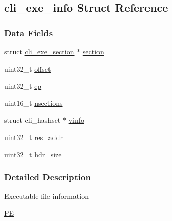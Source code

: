 \hypertarget{structcli__exe__info}{
\subsection{cli\_\-exe\_\-info Struct Reference}
\label{structcli__exe__info}
}
\subsubsection*{Data Fields}
\begin{DoxyCompactItemize}
\item 
struct \hyperlink{structcli__exe__section}{cli\_\-exe\_\-section} $\ast$ \hyperlink{structcli__exe__info_a1c449c2a02971006b72d8ab755684716}{section}
\item 
uint32\_\-t \hyperlink{structcli__exe__info_a894bdfa2d603d8343f8ef01dda6fcd23}{offset}
\item 
uint32\_\-t \hyperlink{structcli__exe__info_afaed4671662028c061ab84eefcce0546}{ep}
\item 
uint16\_\-t \hyperlink{structcli__exe__info_aa4af5e526457df524fc9a4ba46803a70}{nsections}
\item 
struct cli\_\-hashset $\ast$ \hyperlink{structcli__exe__info_a45edc7cf7855a99b33ce31a17c6bdfc6}{vinfo}
\item 
uint32\_\-t \hyperlink{structcli__exe__info_ac0f1b36bb8a1eeb981958dc4643f67dd}{res\_\-addr}
\item 
uint32\_\-t \hyperlink{structcli__exe__info_af2492dd421362ffced98eb583964b310}{hdr\_\-size}
\end{DoxyCompactItemize}


\subsubsection{Detailed Description}
Executable file information \begin{Desc}
\item[\hyperlink{pe__pe000004}{PE}]\end{Desc}



